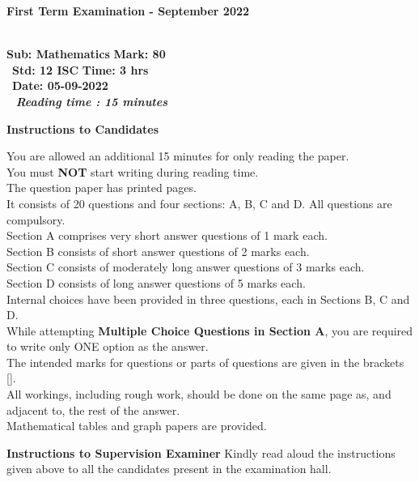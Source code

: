 \documentclass[a4paper,addpoints,12pt,answers]{exam}
\begin{document}
\lhead{}
\chead{}
\rhead{}
\lfoot{}
\rfoot{}

\noindent
\begin{center}
	\large{\textbf{First Term Examination - September 2022}}  \\\
\end{center}
\textbf{Sub: Mathematics} \hfill \textbf{Mark: 80} \hspace{1cm} \\\
\textbf{Std: 12 ISC} \hfill \textbf{Time: 3 hrs} \hspace{1cm} \\\
\textbf{Date: 05-09-2022} \\\
\textbf{\textit{ Reading time : 15 minutes}}

\hrulefill
\textbf{Instructions to Candidates}
\begin{center}
	You are allowed an additional 15 minutes for only reading the paper. \\
	You must \textbf{NOT} start writing during reading time. \\
	The question paper has \pageref{lastpage} printed pages. \\
	 It consists of 20 questions and four sections: A, B, C and D. All questions are compulsory. \\
Section A comprises very short answer questions of 1 mark each. \\
Section B consists of short answer questions of 2 marks each. \\
Section C consists of moderately long answer questions of 3 marks each. \\
Section D consists of long answer questions of 5 marks each. \\
Internal choices have been provided in three questions, each in Sections B, C and D. \\
While attempting \textbf{Multiple Choice Questions in Section A}, you are required to write only ONE option as the answer. \\
The intended marks for questions or parts of questions are given in the brackets []. \\
All workings, including rough work, should be done on the same page as, and adjacent to, the rest of the answer. \\
Mathematical tables and graph papers are provided. \\
\end{center}
\textbf{Instructions to Supervision Examiner}
Kindly read aloud the instructions given above to all the candidates present in the examination hall.
\end{document}
